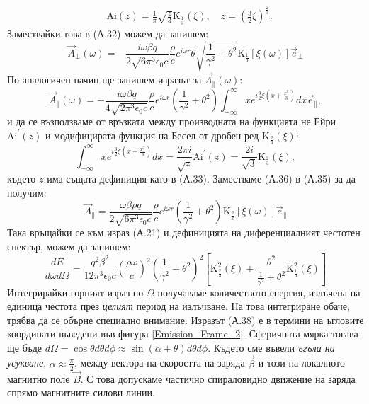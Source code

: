\begin{appendices}
\begin{equation}
\begin{split}
	&\text{Ai}(z) = \frac{1}{\pi}\sqrt{\frac{z}{3}}\text{K}_{\frac{1}{3}}(\xi),\quad z = \left(\frac{3}{2}\xi\right)^{\frac{2}{3}}.
	\end{split}
\end{equation}
Замествайки това в (А.32) можем да запишем:
\begin{equation}
	\boxed{\vec{A}_\perp(\omega) = -\frac{i\omega\beta q}{2\sqrt{6\pi^3\epsilon_0 c}}\frac{\rho}{c}e^{i\omega r}\theta \sqrt{\frac{1}{\gamma^2} + \theta^2}\text{K}_{\frac{1}{3}}[\xi(\omega)]\vec{e}_\perp}
\end{equation}
По аналогичен начин ще запишем изразът за $\vec{A}_\parallel(\omega)$:
\begin{equation}
	\vec{A}_\parallel(\omega) = -\frac{i\omega\beta q}{4\sqrt{2\pi^3\epsilon_0 c}}\frac{\rho}{c}e^{i\omega r}\left(\frac{1}{\gamma^2} + \theta^2\right)\int_{-\infty}^\infty x e^{i\frac{3}{2}\xi\left(x + \frac{x^3}{3}\right)}dx \vec{e}_\parallel,
\end{equation}
и да се възползваме от връзката между производната на функцията не Ейри $\text{Ai}^\prime(z)$ и модифицирата функция на Бесел от дробен ред $\text{K}_{\frac{2}{3}}(\xi)$:
\begin{equation}
	\int_{-\infty}^\infty x e^{i\frac{3}{2}\xi\left(x + \frac{x^3}{3}\right)}dx = \frac{2 \pi i}{\sqrt{z}}\text{Ai}^\prime (z) = \frac{2i}{\sqrt{3}}\text{K}_{\frac{2}{3}}(\xi),
\end{equation}
където $z$ има същата дефиниция като в (А.33). Заместваме (А.36) в (А.35) за да получим:
\begin{equation}
	\boxed{\vec{A}_\parallel = \frac{\omega\beta\rho q}{2\sqrt{6\pi^3\epsilon_0 c}}\frac{\rho}{c}e^{i\omega r}\left( \frac{1}{\gamma^2} + \theta^2 \right) \text{K}_{\frac{2}{3}}[\xi(\omega)]\vec{e}_\parallel}
\end{equation}
Така връщайки се към израз (А.21) и дефиницията на диференциалният честотен спектър, можем да запишем:
\begin{equation}
	\frac{dE}{d\omega d\Omega} = \frac{q^2\beta^2}{12\pi^3\epsilon_0 c}\left(\frac{\rho\omega}{c}\right)^2\left(\frac{1}{\gamma^2}+\theta^2\right)^2\left[\text{K}^2_{\frac{2}{3}}(\xi) + \frac{\theta^2}{\frac{1}{\gamma^2} + \theta^2}\text{K}^2_{\frac{1}{3}}(\xi)\right]
\end{equation}
Интегрирайки горният израз по $\Omega$ получаваме количеството енергия, излъчена на единица честота през \emph{целият} период на излъчване. На това интегриране обаче, трябва да се обърне специално внимание. Изразът (А.38) е в термини на ъгловите координати въведени във фигура \ref{Emission_Frame_2}. Сферичната мярка тогава ще бъде $d\Omega = \cos\theta d\theta d\phi \approx \sin(\alpha + \theta) d\theta d\phi $. Където сме въвели \emph{ъгъла на усукване}, $\alpha \approx \frac{\pi}{2}$, между вектора на скоростта на заряда $\vec{\beta}$ и този на локалното магнитно поле $\vec{B}$. С това допускаме частично спираловидно движение на заряда спрямо магнитните силови линии.

\end{appendices}

